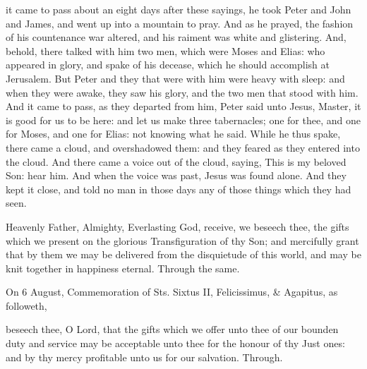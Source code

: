  it came to pass about an eight days after these sayings, he took Peter and John and James, and went up into a mountain to pray. And as he prayed, the fashion of his countenance war altered, and his raiment was white and glistering. And, behold, there talked with him two men, which were Moses and Elias: who appeared in glory, and spake of his decease, which he should accomplish at Jerusalem. But Peter and they that were with him were heavy with sleep: and when they were awake, they saw his glory, and the two men that stood with him. And it came to pass, as they departed from him, Peter said unto Jesus, Master, it is good for us to be here: and let us make three tabernacles; one for thee, and one for Moses, and one for Elias: not knowing what he said. While he thus spake, there came a cloud, and overshadowed them: and they feared as they entered into the cloud. And there came a voice out of the cloud, saying, This is my beloved Son: hear him. And when the voice was past, Jesus was found alone. And they kept it close, and told no man in those days any of those things which they had seen.

\clearpage
{}

\secret
{} Heavenly Father, Almighty, Everlasting God, receive, we beseech thee, the gifts which we present on the glorious Transfiguration of thy Son; and mercifully grant that by them we may be delivered from the disquietude of this world, and may be knit together in happiness eternal. Through the same.
\begin{rubric}
	 On 6 August, Commemoration of Sts. Sixtus II, Felicissimus, \& Agapitus, as followeth,
\end{rubric}
 beseech thee, O Lord, that the gifts which we offer unto thee of our bounden duty and service may be acceptable unto thee for the honour of thy Just ones: and by thy mercy profitable unto us for our salvation. Through.

